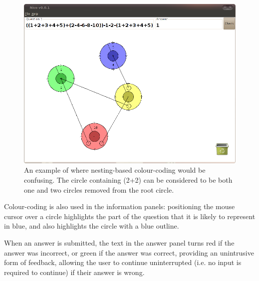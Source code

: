 \documentclass[12pt,twoside,notitlepage,xetex]{report}
\begin{document}
\begin{center}
\begin{figure}[H]
\begin{center}
\includegraphics[width=\textwidth-2cm]{figs/nico_screen_02.png}
\end{center}
\caption{An example of where nesting-based colour-coding would be confusing.  The circle containing (2+2) can be considered to be both one and two circles removed from the root circle.}
\label{fig:Nico2}
\end{figure}
\end{center}

Colour-coding is also used in the information panels: positioning the mouse cursor over a circle highlights the part of the question that it is likely to represent in blue, and also highlights the circle with a blue outline.

When an answer is submitted, the text in the answer panel turns red if the answer was incorrect, or green if the answer was correct, providing an unintrusive form of feedback, allowing the user to continue uninterrupted (i.e. no input is required to continue) if their answer is wrong.
\end{document}
